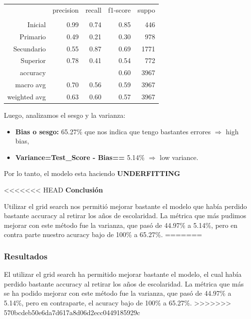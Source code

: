 \documentclass[a4paper]{article}
\begin{document}
            \begin{table}[H]
                \centering
                \begin{tabular}{rrrrr}
                    ~ & precision & recall & f1-score & suppo \\
                    & & & & \\
                    Inicial    & 0.99 & 0.74 & 0.85 & 446 \\
                    Primario   & 0.49 & 0.21 & 0.30 & 978 \\
                    Secundario & 0.55 & 0.87 & 0.69 & 1771 \\
                    Superior   & 0.78 & 0.41 & 0.54 & 772 \\
                    accuracy & & & 0.60 & 3967 \\
                    macro avg & 0.70 & 0.56 & 0.59 & 3967 \\
                    weighted avg & 0.63 & 0.60 & 0.57 & 3967 \\
                \end{tabular}
            \end{table}

            Luego, analizamos el sesgo y la varianza:
            \begin{itemize}
                \item \textbf{Bias o sesgo:} 65.27\% que nos indica que tengo bastantes errores $\Rightarrow$ high bias,
                \item \textbf{Variance=Test\_Score - Bias==} 5.14\%  $\Rightarrow$ low variance.
            \end{itemize}

            Por lo tanto, el modelo esta haciendo \textbf{UNDERFITTING}

<<<<<<< HEAD
            \textbf{Conclusión}
            
            Utilizar el grid search nos permitió mejorar bastante el modelo que había perdido bastante accuracy al retirar los años de escolaridad. La métrica que más pudimos mejorar con este método fue la varianza, que pasó de 44.97\% a 5.14\%, pero en contra parte nuestro acuracy bajo de 100\% a 65.27\%.
=======
            \subsubsection*{Resultados}

            El utilizar el grid search ha permitido mejorar bastante el modelo, el cual había perdido bastante accuracy al retirar los años de escolaridad. La métrica que más se ha podido mejorar con este método fue la varianza, que pasó de 44.97\% a 5.14\%, pero en contraparte, el acuracy bajo de 100\% a 65.27\%.
>>>>>>> 570bcdeb50e6da7d617a8d06d2ecc0449185929c
\end{document}

